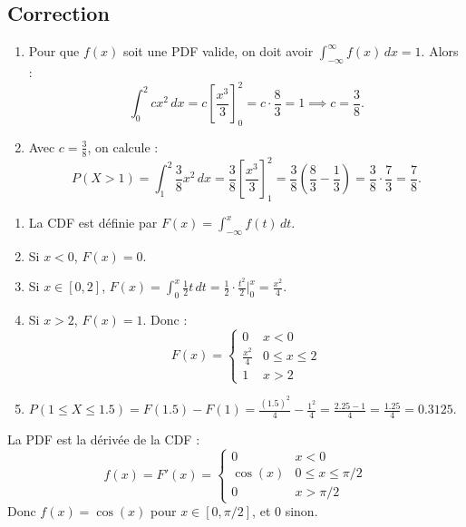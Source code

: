 
\subsection{Correction}

\begin{correctionbox}[Exercice 1 :]
\begin{enumerate}
    \item Pour que $f(x)$ soit une PDF valide, on doit avoir $\int_{-\infty}^{\infty} f(x)\,dx = 1$. Alors :
    \[
    \int_0^2 c x^2 \, dx = c \left[ \frac{x^3}{3} \right]_0^2 = c \cdot \frac{8}{3} = 1 \implies c = \frac{3}{8}.
    \]
    
    \item Avec $c = \frac{3}{8}$, on calcule :
    \[
    P(X > 1) = \int_1^2 \frac{3}{8} x^2 \, dx = \frac{3}{8} \left[ \frac{x^3}{3} \right]_1^2 = \frac{3}{8} \left( \frac{8}{3} - \frac{1}{3} \right) = \frac{3}{8} \cdot \frac{7}{3} = \frac{7}{8}.
    \]
\end{enumerate}
\end{correctionbox}

\begin{correctionbox}[Exercice 2 :]
\begin{enumerate}
    \item La CDF est définie par $F(x) = \int_{-\infty}^x f(t)\,dt$.
    \item Si $x < 0$, $F(x) = 0$.
        \item Si $x \in [0,2]$, $F(x) = \int_0^x \frac{1}{2} t \, dt = \frac{1}{2} \cdot \frac{t^2}{2} \Big|_0^x = \frac{x^2}{4}$.
        \item Si $x > 2$, $F(x) = 1$.
    Donc :
    \[
    F(x) = 
    \begin{cases}
    0 & x < 0 \\
    \frac{x^2}{4} & 0 \le x \le 2 \\
    1 & x > 2
    \end{cases}
    \]

    \item $P(1 \le X \le 1.5) = F(1.5) - F(1) = \frac{(1.5)^2}{4} - \frac{1^2}{4} = \frac{2.25 - 1}{4} = \frac{1.25}{4} = 0.3125$.
\end{enumerate}
\end{correctionbox}

\begin{correctionbox}[Exercice 3 :]
La PDF est la dérivée de la CDF :
\[
f(x) = F'(x) = 
\begin{cases}
0 & x < 0 \\
\cos(x) & 0 \le x \le \pi/2 \\
0 & x > \pi/2
\end{cases}
\]
Donc $f(x) = \cos(x)$ pour $x \in [0, \pi/2]$, et $0$ sinon.

\end{correctionbox}

